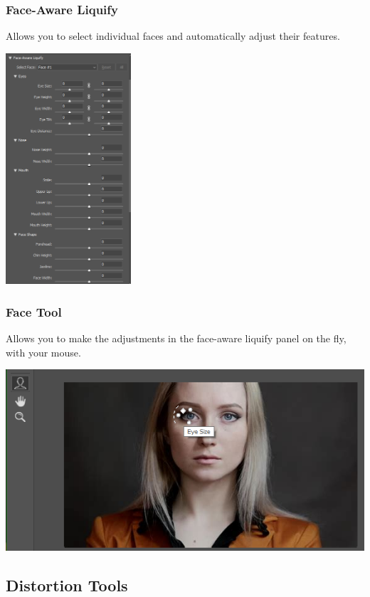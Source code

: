 \documentclass{beamer}
\begin{document}
\begin{frame}
	\frametitle{Face-Aware Liquify}
	\begin{outline}
		\1 Allows you to select individual faces and automatically adjust their features. 
	\end{outline}
	\begin{center}
	\includegraphics[width=0.35\textwidth]{images/face-aware liquify.png}
\end{center}
\end{frame}

\begin{frame}
	\frametitle{Face Tool}
	\begin{outline}
		\1 Allows you to make the adjustments in the face-aware liquify panel on the fly, with your mouse.
	\end{outline}
	\begin{center}
		\includegraphics[width=1.0\textwidth]{images/liquify - face tool.png}
	\end{center}
\end{frame}

\subsection{Distortion Tools}		
\end{document}
